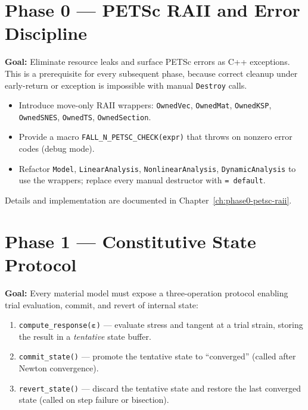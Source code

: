 \section{Phase 0 — PETSc RAII and Error Discipline}
\label{sec:phase0-overview}

\textbf{Goal:} Eliminate resource leaks and surface PETSc errors as C++
exceptions.  This is a prerequisite for every subsequent phase, because
correct cleanup under early-return or exception is impossible with manual
\texttt{Destroy} calls.

\begin{itemize}
  \item Introduce move-only RAII wrappers:
        \texttt{OwnedVec}, \texttt{OwnedMat}, \texttt{OwnedKSP},
        \texttt{OwnedSNES}, \texttt{OwnedTS}, \texttt{OwnedSection}.
  \item Provide a macro \texttt{FALL\_N\_PETSC\_CHECK(expr)} that
        throws on nonzero error codes (debug mode).
  \item Refactor \texttt{Model}, \texttt{LinearAnalysis},
        \texttt{NonlinearAnalysis}, \texttt{DynamicAnalysis} to use
        the wrappers; replace every manual destructor with
        \verb|= default|.
\end{itemize}

Details and implementation are documented in Chapter~\ref{ch:phase0-petsc-raii}.

\section{Phase 1 — Constitutive State Protocol}
\label{sec:phase1-overview}

\textbf{Goal:} Every material model must expose a three-operation protocol
enabling trial evaluation, commit, and revert of internal state:

\begin{enumerate}
  \item \texttt{compute\_response($\boldsymbol\varepsilon$)}
        --- evaluate stress and tangent at a trial strain, storing
        the result in a \emph{tentative} state buffer.
  \item \texttt{commit\_state()} --- promote the tentative state to
        ``converged'' (called after Newton convergence).
  \item \texttt{revert\_state()} --- discard the tentative state and
        restore the last converged state (called on step failure or
        bisection).
\end{enumerate}

